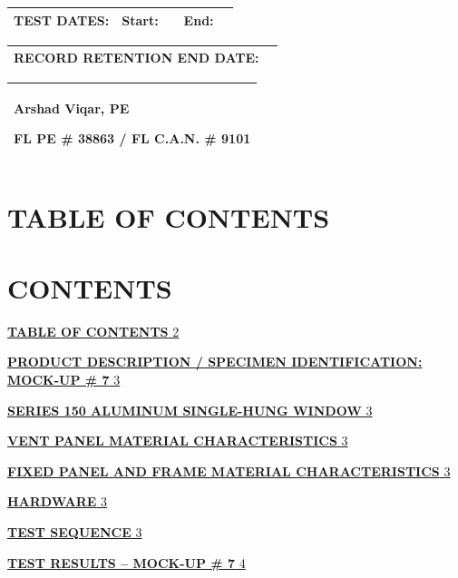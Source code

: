 \begin{longtable}[]{@{}lllll@{}}
\toprule
\endhead
\textbf{TEST DATES:} & Start: & & End: &\tabularnewline
\bottomrule
\end{longtable}

\begin{longtable}[]{@{}ll@{}}
\toprule
\endhead
\textbf{RECORD RETENTION END DATE:} &\tabularnewline
\bottomrule
\end{longtable}

\begin{longtable}[]{@{}l@{}}
\toprule
\endhead
\begin{minipage}[t]{0.97\columnwidth}\raggedright
\textbf{Arshad Viqar, PE}

FL PE \# 38863 / FL C.A.N. \# 9101\strut
\end{minipage}\tabularnewline
\bottomrule
\end{longtable}

\hypertarget{table-of-contents}{%
\section{\texorpdfstring{\textbf{TABLE OF
CONTENTS}}{TABLE OF CONTENTS}}\label{table-of-contents}}

\hypertarget{contents}{%
\section{CONTENTS}\label{contents}}

\protect\hyperlink{table-of-contents}{\textbf{TABLE OF CONTENTS} 2}

\protect\hyperlink{product-description-specimen-identification-mock-up}{\textbf{PRODUCT
DESCRIPTION / SPECIMEN IDENTIFICATION: MOCK-UP \# 7} 3}

\protect\hyperlink{_Toc191563502}{\textbf{SERIES 150 ALUMINUM
SINGLE-HUNG WINDOW} 3}

\protect\hyperlink{vent-panel-material-characteristics}{\textbf{VENT
PANEL MATERIAL CHARACTERISTICS} 3}

\protect\hyperlink{fixed-panel-and-frame-material-characteristics}{\textbf{FIXED
PANEL AND FRAME MATERIAL CHARACTERISTICS} 3}

\protect\hyperlink{hardware}{\textbf{HARDWARE} 3}

\protect\hyperlink{test-sequence}{\textbf{TEST SEQUENCE} 3}

\protect\hyperlink{test-results-mock-up}{\textbf{TEST RESULTS -- MOCK-UP
\# 7} 4}

